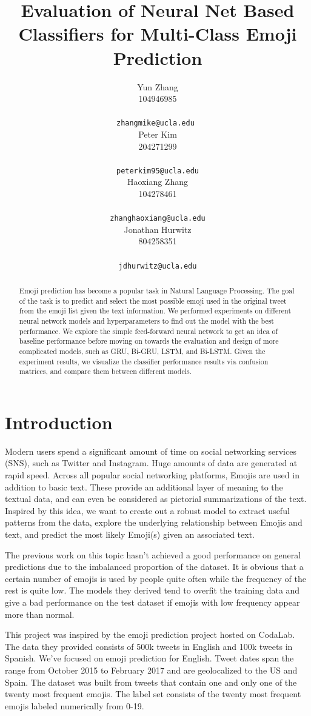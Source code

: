 \documentclass[11pt,a4paper]{article}
\title{Evaluation of Neural Net Based Classifiers for Multi-Class Emoji Prediction}
\author{Yun Zhang \\
	 104946985 \\
	 \\
	\small{\tt zhangmike@ucla.edu } \\\And
	Peter Kim \\
	204271299 \\
	 \\
	\small{\tt peterkim95@ucla.edu} \\\And
	Haoxiang Zhang \\
	104278461 \\
	 \\
	\small{\tt zhanghaoxiang@ucla.edu} \\\And
	 Jonathan Hurwitz \\
	 804258351 \\
	 \\
	\small{\tt jdhurwitz@ucla.edu} \\
}
\date{}
\begin{document}
	\maketitle
	\begin{abstract}
	Emoji prediction has become a popular task in Natural Language Processing. The goal of the task is to predict and select the most possible emoji used in the original tweet from the emoji list given the text information. We performed experiments on different neural network models and hyperparameters to find out the model with the best performance. We explore the simple feed-forward neural network to get an idea of baseline performance before moving on towards the evaluation and design of more complicated models, such as GRU, Bi-GRU, LSTM, and Bi-LSTM. Given the experiment results, we visualize the classifier performance results via confusion matrices, and compare them between different models.
	\end{abstract}
	
	\section{Introduction}
	
	Modern users spend a significant amount of time on social networking services (SNS), such as Twitter and Instagram. Huge amounts of data are generated at rapid speed. Across all popular social networking platforms, Emojis are used in addition to basic text. These provide an additional layer of meaning to the textual data, and can even be considered as pictorial summarizations of the text. Inspired by this idea, we want to create out a robust model to extract useful patterns from the data, explore the underlying relationship between Emojis and text, and predict the most likely Emoji(s) given an associated text.
	\par
	The previous work on this topic hasn’t achieved a good performance on general predictions due to the imbalanced proportion of the dataset. It is obvious that a certain number of emojis is used by people quite often while the frequency of the rest is quite low. The models they derived tend to overfit the training data and give a bad performance on the test dataset if emojis with low frequency appear more than normal.
	\par
	This project was inspired by the emoji prediction project hosted on CodaLab. The data they provided consists of 500k tweets in English and 100k tweets in Spanish. We’ve focused on emoji prediction for English. Tweet dates span the range from October 2015 to February 2017 and are geolocalized to the US and Spain. The dataset was built from tweets that contain one and only one of the twenty most frequent emojis. The label set consists of the twenty most frequent emojis labeled numerically from 0-19.
	
\end{document}
